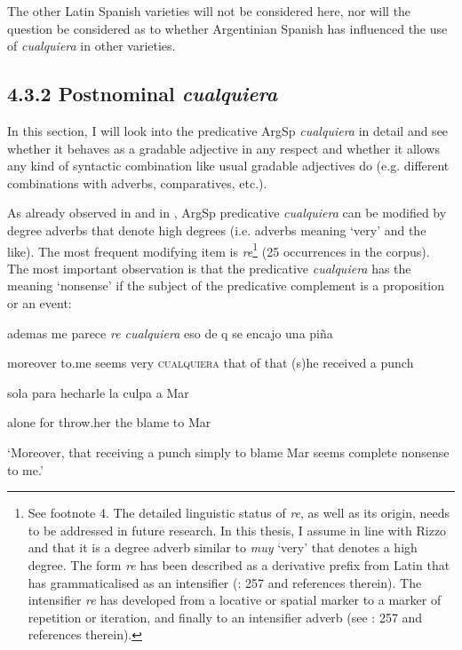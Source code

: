   The other Latin Spanish varieties will not be considered here, nor will the question be considered as to whether Argentinian Spanish has influenced the use of \textit{cualquiera} in other varieties. 

\subsection{\textbf{4.3.2} \textbf{Postnominal} \textbf{\textit{cualquiera}}}

In this section, I will look into the predicative ArgSp \textit{cualquiera} in detail and see whether it behaves as a gradable adjective in any respect and whether it allows any kind of syntactic combination like usual gradable adjectives do (e.g. different combinations with adverbs, comparatives, etc.). 

  As already observed in  and in , ArgSp predicative \textit{cualquiera} can be modified by degree adverbs that denote high degrees (i.e. adverbs meaning ‘very’ and the like). The most frequent modifying item is \textit{re}\footnote{{See footnote 4. The detailed linguistic status of} {\textit{re}}{, as well as its origin, needs to be addressed in future research. In this thesis, I assume in line with Rizzo \citet{Salierno2013} and \citet{KanwitTerán2020} that it is a degree adverb similar to} {\textit{muy}} {‘very’ that denotes a high degree. The form} {\textit{re}} {has been described as a derivative prefix from Latin that has grammaticalised as an intensifier (\citealt{KanwitTerán2020}: 257 and references therein). The intensifier} {\textit{re}} {has developed from a locative or spatial marker to a marker of repetition or iteration, and finally to an intensifier adverb (see \citealt{KanwitTerán2020}: 257 and references therein).}} (25 occurrences in the corpus). The most important observation is that the predicative \textit{cualquiera} has the meaning ‘nonsense’ if the subject of the predicative complement is a proposition or an event:

    ademas  me  parece  \textit{re  cualquiera} eso  de  q  se  encajo  una  piña  

    moreover  to.me  seems  very  \textsc{cualquiera}  that  of  that  (s)he  received  a  punch  

    sola  para  hecharle  la  culpa  a  Mar

    alone  for  throw.her  the  blame  to  Mar

    ‘Moreover, that receiving a punch simply to blame Mar seems complete nonsense to me.’

